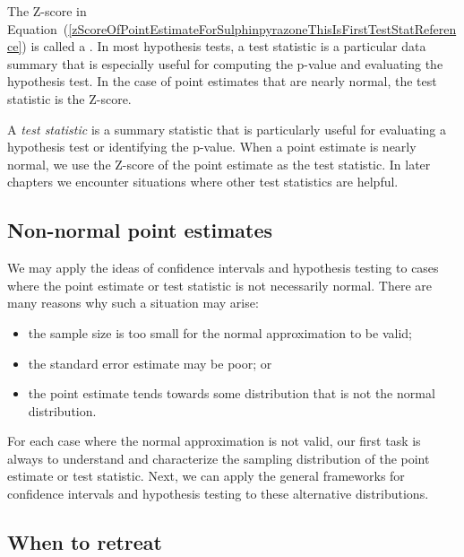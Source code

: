 The Z-score in Equation~(\ref{zScoreOfPointEstimateForSulphinpyrazoneThisIsFirstTestStatReference}) is called a . In most hypothesis tests, a test statistic is a particular data summary that is especially useful for computing the p-value and evaluating the hypothesis test. In the case of point estimates that are nearly normal, the test statistic is the Z-score.

\begin{termBox}{
A \emph{test statistic} is a summary statistic that is particularly useful for evaluating a hypothesis test or identifying the p-value. When a point estimate is nearly normal, we use the Z-score of the point estimate as the test statistic. In later chapters we encounter situations where other test statistics are helpful.}
\end{termBox}


\subsection{Non-normal point estimates}

We may apply the ideas of confidence intervals and hypothesis testing to cases where the point estimate or test statistic is not necessarily normal. There are many reasons why such a situation may arise:
\begin{itemize}
\setlength{\itemsep}{0mm}
\item the sample size is too small for the normal approximation to be valid;
\item the standard error estimate may be poor; or
\item the point estimate tends towards some distribution that is not the normal distribution.
\end{itemize}
For each case where the normal approximation is not valid, our first task is always to understand and characterize the sampling distribution of the point estimate or test statistic. Next, we can apply the general frameworks for confidence intervals and hypothesis testing to these alternative distributions.


\textC{\newpage}


\subsection{When to retreat}
\label{whenToRetreat}

